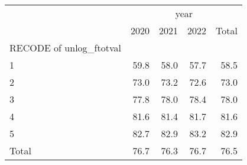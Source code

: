 \begin{tabular}{lllll}
\cline{1-5}
\multicolumn{1}{c}{} &
  \multicolumn{4}{|c}{year} \\
\multicolumn{1}{c}{} &
  \multicolumn{1}{|r}{2020} &
  \multicolumn{1}{r}{2021} &
  \multicolumn{1}{r}{2022} &
  \multicolumn{1}{r}{Total} \\
\cline{1-5}
\multicolumn{1}{l}{RECODE of unlog\_ftotval} &
  \multicolumn{1}{|r}{} &
  \multicolumn{1}{r}{} &
  \multicolumn{1}{r}{} &
  \multicolumn{1}{r}{} \\
\multicolumn{1}{l}{\hspace{1em}1} &
  \multicolumn{1}{|r}{59.8} &
  \multicolumn{1}{r}{58.0} &
  \multicolumn{1}{r}{57.7} &
  \multicolumn{1}{r}{58.5} \\
\multicolumn{1}{l}{\hspace{1em}2} &
  \multicolumn{1}{|r}{73.0} &
  \multicolumn{1}{r}{73.2} &
  \multicolumn{1}{r}{72.6} &
  \multicolumn{1}{r}{73.0} \\
\multicolumn{1}{l}{\hspace{1em}3} &
  \multicolumn{1}{|r}{77.8} &
  \multicolumn{1}{r}{78.0} &
  \multicolumn{1}{r}{78.4} &
  \multicolumn{1}{r}{78.0} \\
\multicolumn{1}{l}{\hspace{1em}4} &
  \multicolumn{1}{|r}{81.6} &
  \multicolumn{1}{r}{81.4} &
  \multicolumn{1}{r}{81.7} &
  \multicolumn{1}{r}{81.6} \\
\multicolumn{1}{l}{\hspace{1em}5} &
  \multicolumn{1}{|r}{82.7} &
  \multicolumn{1}{r}{82.9} &
  \multicolumn{1}{r}{83.2} &
  \multicolumn{1}{r}{82.9} \\
\multicolumn{1}{l}{\hspace{1em}Total} &
  \multicolumn{1}{|r}{76.7} &
  \multicolumn{1}{r}{76.3} &
  \multicolumn{1}{r}{76.7} &
  \multicolumn{1}{r}{76.5} \\
\cline{1-5}
\end{tabular}
